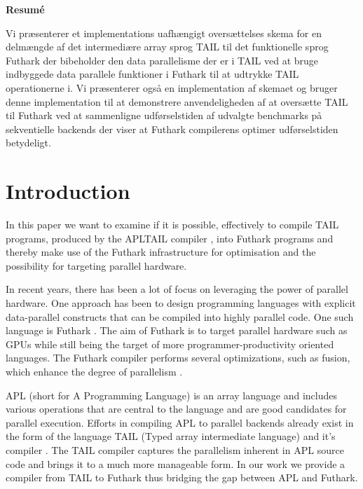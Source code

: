 \documentclass[11pt]{article}
\begin{document}
\begin{center}
\textbf{Resumé}
\end{center}
Vi præsenterer et implementations uafhængigt oversættelses skema for en delmængde af det intermediære array sprog TAIL til det funktionelle sprog Futhark der bibeholder den data parallelisme der er i TAIL ved at bruge indbyggede data parallele funktioner i Futhark til at udtrykke TAIL operationerne i. Vi præsenterer også en implementation af skemaet og bruger denne implementation til at demonstrere anvendeligheden af at oversætte TAIL til Futhark ved at sammenligne udførselstiden af udvalgte benchmarks på sekventielle backends der viser at Futhark compilerens optimer udførselstiden betydeligt.

\newpage

\tableofcontents

\newpage

\section{Introduction}
\label{intro}
In this paper we want to examine if it is possible, effectively to compile TAIL programs, produced by the APLTAIL compiler \cite{ElsmanDybdal:Array:2014}, into Futhark programs \cite{TroelsHenriksen} and thereby make use of the Futhark infrastructure for optimisation and the possibility for targeting parallel hardware.

In recent years, there has been a lot of focus on leveraging the power of parallel hardware. 
One approach has been to design programming languages with explicit data-parallel constructs that can be compiled 
into highly parallel code. One such language is Futhark \cite{TroelsHenriksen}. The aim of Futhark is to target parallel hardware such as 
GPUs while still being the target of more programmer-productivity oriented languages. The Futhark compiler 
performs several optimizations, such as fusion, which enhance the degree of 
parallelism \cite{T.Henriksen&C.Oancea} \cite{T2graph} \cite{Hybrid}.

APL (short for A Programming Language) \cite{APLbook} is an array language and includes various operations that are central to the language and are good candidates 
for parallel execution. Efforts in compiling APL to parallel backends already exist in the form of the language 
TAIL (Typed array intermediate language) and it’s compiler \cite{ElsmanDybdal:Array:2014}.
The TAIL compiler captures the parallelism inherent in APL source code and brings it to a much more manageable form.
In our work we provide a compiler from TAIL 
to Futhark thus bridging the gap between APL and Futhark.
\end{document}
